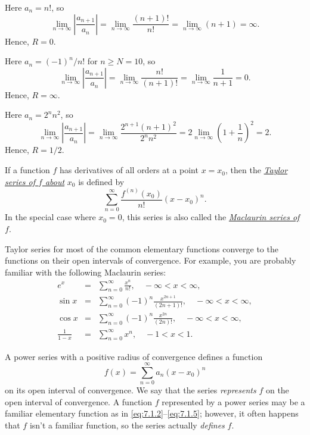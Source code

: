 \begin{examplesolution}
 Here $a_{n}=n!$, so
\[
  \lim_{n\to\infty}\left|\frac{a_{n+1}}{a_{n}}\right|=\lim_{n\to\infty}\frac{(n+1)!}{n!}=\lim_{n\to\infty}(n+1)=\infty.
\]
Hence, $R=0$.

 Here $a_{n}=(-1)^{n}/n!$ for $n\ge N=10$, so
\[
  \lim_{n\to\infty}\left|\frac{a_{n+1}}{a_{n}}\right|=\lim_{n\to\infty}\frac{n!}{(n+1)!}=\lim_{n\to\infty}\frac{1}{n+1}=0.
\]
Hence, $R=\infty$.

 Here $a_{n}=2^{n}n^{2}$, so
\[
  \lim_{n\to\infty}\left|\frac{a_{n+1}}{a_{n}}\right|=\lim_{n\to\infty}\frac{2^{n+1}(n+1)^{2}}{2^{n}n^{2}}=2\lim_{n\to\infty}\left(1+\frac{1}{n}\right)^{2}=2.
\]
Hence, $R=1/2$.
\end{examplesolution}


\noindent
If a function $f$ has derivatives of all orders at a point $x=x_{0}$, then the
\href{https://mathshistory.st-andrews.ac.uk/Biographies/Taylor/}{\color{blue}
\it Taylor series of $f$ about\/}
$x_{0}$ is defined by
\[
  \sum_{n=0}^{\infty}\frac{f^{(n)}(x_{0})}{n!}(x-x_{0})^{n}.
\]
In the special case where $x_{0}=0$, this series is also called the
\href{https://mathshistory.st-andrews.ac.uk/Biographies/Maclaurin/}{\color{blue}
\it Maclaurin series of\/} $f$.

Taylor series for most of the common elementary functions converge to the functions on their open
intervals of convergence. For example, you are probably familiar with the following Maclaurin
series:
\begin{eqnarray}
  e^x&=&\sum_{n=0}^\infty {\frac{x^{n}}{n!}},\quad -\infty<x<\infty,\label{eq:7.1.2}\\ \sin x&=&\sum_{n=0}^\infty(-1)^n \frac{x^{2n+1}}{(2n+1)!},\quad -\infty<x<\infty, \label{eq:7.1.3}\\ %
  \cos x&=&\sum_{n=0}^\infty(-1)^n \frac{x^{2n}}{(2n)!},\quad -\infty<x<\infty, \label{eq:7.1.4}\\ %
  {\frac{1}{1-x}}&=&\sum_{n=0}^\infty x^n,\quad-1<x<1.\label{eq:7.1.5}
\end{eqnarray}


\noindent
A power series with a positive radius of convergence defines a function
\[
  f(x)=\sum_{n=0}^{\infty}a_{n}(x-x_{0})^{n}
\]
on its open interval of convergence. We say that the series {\color{blue}\it represents\/} $f$ on
the open interval of convergence. A function $f$ represented by a power series may be a familiar
elementary function as in \eqref{eq:7.1.2}--\eqref{eq:7.1.5}; however, it often happens that $f$
isn't a familiar function, so the series actually {\color{blue}\it defines\/} $f$.

